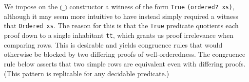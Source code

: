 \documentclass[authoryear, acmsmall, screen, review, nonacm]{acmart} %
\begin{document}
\begin{code}[hide]
\AgdaSymbol{(\AgdaUnderscore{}}\AgdaSpace{}%
\AgdaOperator{\AgdaInductiveConstructor{,}}\AgdaSpace{}%
\AgdaSymbol{)}\AgdaSpace{}%
\AgdaSpace{}%
\AgdaSpace{}%
\AgdaSpace{}%
\AgdaSymbol{\})}\<%
\\
\>[0]\AgdaSpace{}%
\AgdaSymbol{|}\AgdaSpace{}%
\AgdaSpace{}%
%
\>[12]\AgdaSymbol{|}\AgdaSpace{}%
\AgdaSpace{}%
%
\>[21]\AgdaSymbol{=}\AgdaSpace{}%
\AgdaSpace{}%
\AgdaSpace{}%
\AgdaSymbol{\{}\AgdaSpace{}%
\AgdaSymbol{(}\AgdaSpace{}%
\AgdaOperator{\AgdaInductiveConstructor{,}}\AgdaSpace{}%
\AgdaSymbol{\AgdaUnderscore{})}\AgdaSpace{}%
\AgdaSpace{}%
\AgdaSpace{}%
\AgdaSymbol{\})}\<%
\\
\>[0]\AgdaSpace{}%
\AgdaSymbol{|}\AgdaSpace{}%
%
\>[10]\AgdaSpace{}%
\AgdaSymbol{|}\AgdaSpace{}%
%
\>[18]%
\>[21]\AgdaSymbol{=}\AgdaSpace{}%
\AgdaSpace{}%
\AgdaSpace{}%
\AgdaSymbol{\{}\AgdaSpace{}%
\AgdaSymbol{(}\AgdaSpace{}%
\AgdaOperator{\AgdaInductiveConstructor{,}}\AgdaSpace{}%
\AgdaSymbol{\AgdaUnderscore{})}\AgdaSpace{}%
\AgdaSpace{}%
\AgdaSpace{}%
\AgdaSymbol{\})}\<%
\end{code} 
We impose on the \verb!⦅_⦆! constructor a witness of the form \verb!True! \verb!(ordered? xs)!, although it may seem more intuitive to have instead simply required a witness that \verb!Ordered xs!. The reason for this is that the \verb!True! predicate quotients each proof down to a single inhabitant \verb!tt!, which grants us proof irrelevance when comparing rows. This is desirable and yields congruence rules that would otherwise be blocked by two differing proofs of well-orderedness. The congruence rule below asserts that two simple rows are equivalent even with differing proofs. (This pattern is replicable for any decidable predicate.)
\end{document}
